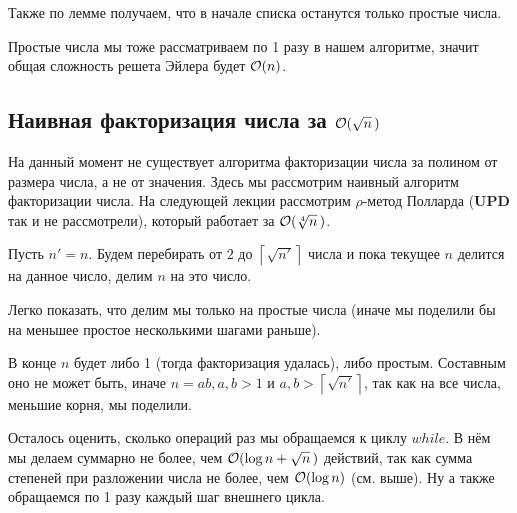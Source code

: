 \documentclass[a4paper, 12pt]{article}
\begin{document}
Также по лемме получаем, что в начале списка останутся только простые числа.

Простые числа мы тоже рассматриваем по 1 разу в нашем алгоритме, значит
общая сложность решета Эйлера будет $\mathcal{O}(n)$.

\subsection{Наивная факторизация числа за $\mathcal{O}(\sqrt{n}\,)$}

На данный момент не существует алгоритма факторизации числа за
полином от размера числа, а не от значения. Здесь мы рассмотрим наивный алгоритм
факторизации числа. На следующей лекции рассмотрим $\rho$-метод Полларда 
({\bf UPD} так и не рассмотрели), который работает за $\mathcal{O}(\sqrt[4]{n}\,)$.

Пусть $n' = n$.
Будем перебирать от $2$ до $\left\lceil \sqrt{n'} \right\rceil$ числа и пока
текущее $n$ делится на данное число, делим $n$ на это число.

Легко показать, что делим мы только на простые числа (иначе мы поделили бы на
меньшее простое несколькими шагами раньше).

В конце $n$ будет либо 1 (тогда факторизация удалась), либо простым. Составным
оно не может быть, иначе $n = ab, a, b > 1$ и $a, b > \left\lceil \sqrt{n'}\right\rceil$, 
так как на все числа, меньшие корня, мы поделили.

Осталось оценить, сколько операций раз мы обращаемся к циклу $while$. В нём мы делаем
суммарно не более, чем $\mathcal{O}(\log n + \sqrt{n}\,)$ действий, так как сумма
степеней при разложении числа не более, чем $\mathcal{O}(\log n)$ (см. выше). Ну а также
обращаемся по 1 разу каждый шаг внешнего цикла.
\end{document}
